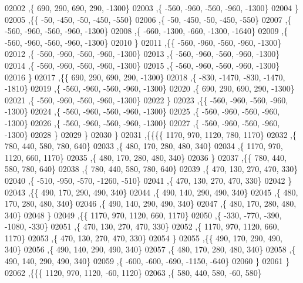 \begin{DoxyCode}
02002     ,\{   690,   290,   690,   290, -1300\}
02003     ,\{  -560,  -960,  -560,  -960, -1300\}
02004     \}
02005    ,\{\{   -50,  -450,   -50,  -450,  -550\}
02006     ,\{   -50,  -450,   -50,  -450,  -550\}
02007     ,\{  -560,  -960,  -560,  -960, -1300\}
02008     ,\{  -660, -1300,  -660, -1300, -1640\}
02009     ,\{  -560,  -960,  -560,  -960, -1300\}
02010     \}
02011    ,\{\{  -560,  -960,  -560,  -960, -1300\}
02012     ,\{  -560,  -960,  -560,  -960, -1300\}
02013     ,\{  -560,  -960,  -560,  -960, -1300\}
02014     ,\{  -560,  -960,  -560,  -960, -1300\}
02015     ,\{  -560,  -960,  -560,  -960, -1300\}
02016     \}
02017    ,\{\{   690,   290,   690,   290, -1300\}
02018     ,\{  -830, -1470,  -830, -1470, -1810\}
02019     ,\{  -560,  -960,  -560,  -960, -1300\}
02020     ,\{   690,   290,   690,   290, -1300\}
02021     ,\{  -560,  -960,  -560,  -960, -1300\}
02022     \}
02023    ,\{\{  -560,  -960,  -560,  -960, -1300\}
02024     ,\{  -560,  -960,  -560,  -960, -1300\}
02025     ,\{  -560,  -960,  -560,  -960, -1300\}
02026     ,\{  -560,  -960,  -560,  -960, -1300\}
02027     ,\{  -560,  -960,  -560,  -960, -1300\}
02028     \}
02029    \}
02030   \}
02031  ,\{\{\{\{  1170,   970,  1120,   780,  1170\}
02032     ,\{   780,   440,   580,   780,   640\}
02033     ,\{   480,   170,   280,   480,   340\}
02034     ,\{  1170,   970,  1120,   660,  1170\}
02035     ,\{   480,   170,   280,   480,   340\}
02036     \}
02037    ,\{\{   780,   440,   580,   780,   640\}
02038     ,\{   780,   440,   580,   780,   640\}
02039     ,\{   470,   130,   270,   470,   330\}
02040     ,\{  -510,  -950,  -570, -1260,  -510\}
02041     ,\{   470,   130,   270,   470,   330\}
02042     \}
02043    ,\{\{   490,   170,   290,   490,   340\}
02044     ,\{   490,   140,   290,   490,   340\}
02045     ,\{   480,   170,   280,   480,   340\}
02046     ,\{   490,   140,   290,   490,   340\}
02047     ,\{   480,   170,   280,   480,   340\}
02048     \}
02049    ,\{\{  1170,   970,  1120,   660,  1170\}
02050     ,\{  -330,  -770,  -390, -1080,  -330\}
02051     ,\{   470,   130,   270,   470,   330\}
02052     ,\{  1170,   970,  1120,   660,  1170\}
02053     ,\{   470,   130,   270,   470,   330\}
02054     \}
02055    ,\{\{   490,   170,   290,   490,   340\}
02056     ,\{   490,   140,   290,   490,   340\}
02057     ,\{   480,   170,   280,   480,   340\}
02058     ,\{   490,   140,   290,   490,   340\}
02059     ,\{  -600,  -600,  -690, -1150,  -640\}
02060     \}
02061    \}
02062   ,\{\{\{  1120,   970,  1120,   -60,  1120\}
02063     ,\{   580,   440,   580,   -60,   580\}

\end{DoxyCode}
